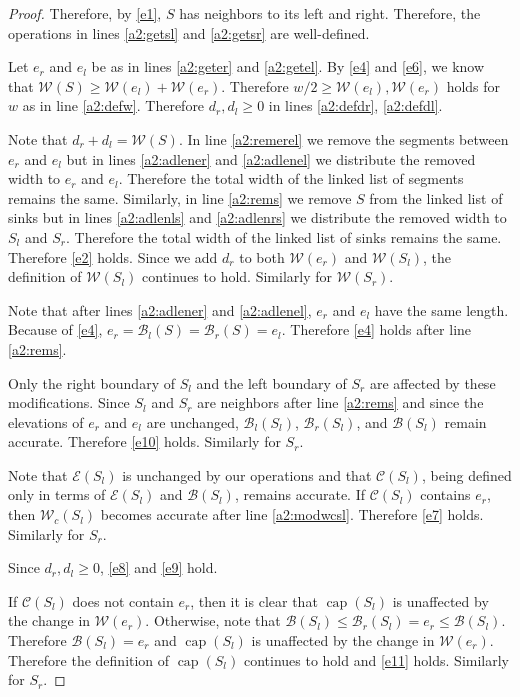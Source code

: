 \documentclass[11pt,a4paper]{article}
\DeclareMathOperator{\capp}{cap}
\begin{document}
\begin{proof}
Therefore, by \ref{e1}, $S$ has neighbors to its left and right.
Therefore, the operations in lines \ref{a2:getsl} and \ref{a2:getsr} are well-defined.

Let $e_r$ and $e_l$ be as in lines \ref{a2:geter} and \ref{a2:getel}.
By \ref{e4} and \ref{e6}, we know that $\mathcal{W}(S) \ge \mathcal{W}(e_l) + \mathcal{W}(e_r)$.
Therefore $w/2 \ge \mathcal{W}(e_l), \mathcal{W}(e_r)$ holds for $w$ as in line \ref{a2:defw}.
Therefore $d_r, d_l \ge 0$ in lines \ref{a2:defdr}, \ref{a2:defdl}.

Note that $d_r + d_l = \mathcal{W}(S)$.
In line \ref{a2:remerel} we remove the segments between $e_r$ and $e_l$ but in lines \ref{a2:adlener} and \ref{a2:adlenel} we distribute the removed width to $e_r$ and $e_l$.
Therefore the total width of the linked list of segments remains the same.
Similarly, in line \ref{a2:rems} we remove $S$ from the linked list of sinks but in lines \ref{a2:adlenls} and \ref{a2:adlenrs} we distribute the removed width to $S_l$ and $S_r$.
Therefore the total width of the linked list of sinks remains the same.
Therefore \ref{e2} holds.
Since we add $d_r$ to both $\mathcal{W}(e_r)$ and $\mathcal{W}(S_l)$, the definition of $\mathcal{W}(S_l)$ continues to hold.
Similarly for $\mathcal{W}(S_r)$.

Note that after lines \ref{a2:adlener} and \ref{a2:adlenel}, $e_r$ and $e_l$ have the same length.
Because of \ref{e4}, $e_r = \mathcal{B}_l(S) = \mathcal{B}_r(S) = e_l$.
Therefore \ref{e4} holds after line \ref{a2:rems}.

Only the right boundary of $S_l$ and the left boundary of $S_r$ are affected by these modifications.
Since $S_l$ and $S_r$ are neighbors after line \ref{a2:rems} and since the elevations of $e_r$ and $e_l$ are unchanged, $\mathcal{B}_l(S_l)$, $\mathcal{B}_r(S_l)$, and $\mathcal{B}(S_l)$ remain accurate.
Therefore \ref{e10} holds.
Similarly for $S_r$.

Note that $\mathcal{E}(S_l)$ is unchanged by our operations and that $\mathcal{C}(S_l)$, being defined only in terms of $\mathcal{E}(S_l)$ and $\mathcal{B}(S_l)$, remains accurate.
If $\mathcal{C}(S_l)$ contains $e_r$, then $\mathcal{W}_c(S_l)$ becomes accurate after line \ref{a2:modwcsl}.
Therefore \ref{e7} holds.
Similarly for $S_r$.

Since $d_r, d_l \ge 0$, \ref{e8} and \ref{e9} hold.

If $\mathcal{C}(S_l)$ does not contain $e_r$, then it is clear that $\capp(S_l)$ is unaffected by the change in $\mathcal{W}(e_r)$.
Otherwise, note that $\mathcal{B}(S_l) \le \mathcal{B}_r(S_l) = e_r \le \mathcal{B}(S_l)$.
Therefore $\mathcal{B}(S_l) = e_r$ and $\capp(S_l)$ is unaffected by the change in $\mathcal{W}(e_r)$.
Therefore the definition of $\capp(S_l)$ continues to hold and \ref{e11} holds.
Similarly for $S_r$.


\end{proof}
\end{document}
